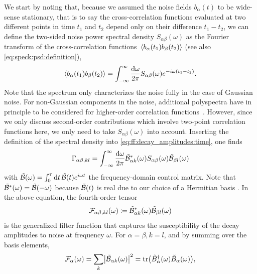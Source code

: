 We start by noting that, because we assumed the noise fields $b_\alpha(t)$ to be wide-sense stationary, that is to say the cross-correlation functions evaluated at two different points in time $t_1$ and $t_2$ depend only on their difference $t_1 - t_2$, we can define the two-sided noise power spectral density $S_{\alpha\beta}(\omega)$ as the Fourier transform of the cross-correlation functions $\expval*{b_\alpha(t_1) b_\beta(t_2)}$ (see also \cref{eq:speck:psd:definition}),
\begin{equation}\label{eq:ff:spectral_density}
    \expval{b_\alpha(t_1) b_{\beta}(t_2)} = \int_{-\infty}^{\infty}\frac{\dd{\omega}}{2\pi} S_{\alpha\beta}(\omega)e^{-i\omega (t_1 - t_2)}.
\end{equation}
Note that the spectrum only characterizes the noise fully in the case of Gaussian noise.
For non-Gaussian components in the noise, additional polyspectra have in principle to be considered for higher-order correlation functions~\cite{Norris2016}.
However, since we only discuss second-order contributions which involve two-point correlation functions here, we only need to take $S_{\alpha\beta}(\omega)$ into account.
Inserting the definition of the spectral density into \cref{eq:ff:decay_amplitudes:time}, one finds
\begin{equation}\label{eq:ff:decay_amplitudes:freq}
    \Gamma_{\alpha\beta,kl} = \int_{-\infty}^{\infty}\frac{\dd{\omega}}{2\pi}\tilde{\mathcal{B}}^\ast_{\alpha k}(\omega)S_{\alpha\beta}(\omega)\tilde{\mathcal{B}}_{\beta l}(\omega)
\end{equation}
with $\tilde{\mathcal{B}}(\omega) = \int_0^\tau\dd{t}\tilde{\mathcal{B}}(t)e^{i\omega t}$ the frequency-domain control matrix.
Note that $\tilde{\mathcal{B}}^\ast(\omega) = \tilde{\mathcal{B}}(-\omega)$ because $\tilde{\mathcal{B}}(t)$ is real due to our choice of a Hermitian basis \basis.
In the above equation, the fourth-order tensor
\begin{equation}\label{eq:ff:filter_function:generalized}
    \mathcal{F}_{\alpha\beta,kl}(\omega)\coloneqq\tilde{\mathcal{B}}^\ast_{\alpha k}(\omega)\tilde{\mathcal{B}}_{\beta l}(\omega)
\end{equation}
is the generalized filter function that captures the susceptibility of the decay amplitudes to noise at frequency $\omega$.
For $\alpha = \beta, k = l$, and by summing over the basis elements,
\begin{equation}\label{eq:ff:filter_function:fidelity}
    \mathcal{F}_{\alpha}(\omega) = \sum_k\bigl\lvert\tilde{\mathcal{B}}_{\alpha k}(\omega)\bigr\rvert^2 = \tr(\tilde{B}_\alpha^\dagger(\omega)\tilde{B}_\alpha(\omega)),
\end{equation}
